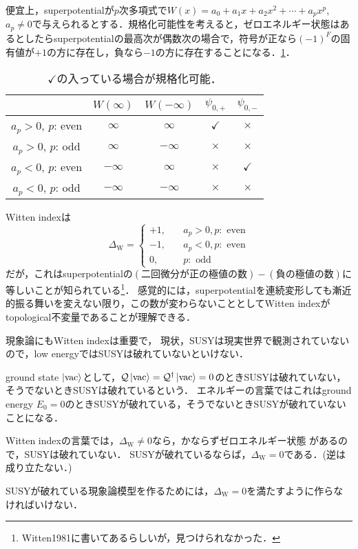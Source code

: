 \documentclass[english, dvipdfmx, a4paper]{jsarticle}
\theoremstyle{break}
\newcommand{\Q}{\mathcal{Q}}
\begin{document}
	便宜上，superpotentialが$p$次多項式で$W(x) = a_0 + a_1x + a_2x^2 +\cdots + a_px^{p}$, $a_p\neq 0$で与えられるとする．規格化可能性を考えると，ゼロエネルギー状態はあるとしたらsuperpotentialの最高次が偶数次の場合で，符号が正なら$(-1)^{F}$の固有値が$+1$の方に存在し，負なら$-1$の方に存在することになる．\ref{tab:normalizability}．
	\begin{table}[htbp]
		\centering
		\label{tab:normalizability}
		\caption{$\checkmark$の入っている場合が規格化可能．}
		\begin{tabular}{c | cccc}\hline
			 & $W(\infty)$ & $W(-\infty)$ & $\psi_{0, +}$ & $\psi_{0, -}$\\\hline
			$a_p > 0$, $p$: even & $\infty$ & $\infty$ & $\checkmark$ & $\times$\\
			$a_p > 0$, $p$: odd & $\infty$ & $-\infty$ & $\times$ & $\times$\\
			$a_p < 0$, $p$: even & $-\infty$ & $\infty$ & $\times$ & $\checkmark$\\
			$a_p < 0$, $p$: odd & $-\infty$ & $-\infty$ & $\times$ & $\times$\\\hline
		\end{tabular}
	\end{table}

	Witten indexは
	\begin{equation}
		\Delta_{\text{W}} = 
		\begin{cases}
			+1,\quad & a_p>0, p:\text{ even}\\
			-1,\quad & a_p<0, p:\text{ even}\\
			0, \quad & p:\text{ odd}
		\end{cases}
	\end{equation}
	だが，これはsuperpotentialの$(\text{二回微分が正の極値の数}) - (\text{負の極値の数})$に等しいことが知られている\footnote{Witten1981に書いてあるらしいが，見つけられなかった．}．
	感覚的には，superpotentialを連続変形しても漸近的振る舞いを変えない限り，この数が変わらないこととしてWitten indexがtopological不変量であることが理解できる．


	現象論にもWitten indexは重要で，
	現状，SUSYは現実世界で観測されていないので，low energyではSUSYは破れていないといけない．

	ground state $\ket{\text{vac}}$として，$\Q\ket{\text{vac}} = \Q^{\dag}\ket{\text{vac}} = 0$のときSUSYは破れていない，そうでないときSUSYは破れているという．
	エネルギーの言葉ではこれはground energy $E_0 = 0$のときSUSYが破れている，そうでないときSUSYが破れていないことになる．

	Witten indexの言葉では，$\Delta_\text{W}\neq0$なら，かならずゼロエネルギー状態
	があるので，SUSYは破れていない．
	SUSYが破れているならば，$\Delta_\text{W} = 0$である．(逆は成り立たない．)

	SUSYが破れている現象論模型を作るためには，$\Delta_{\text{W}} = 0$を満たすように作らなければいけない．
\end{document}
